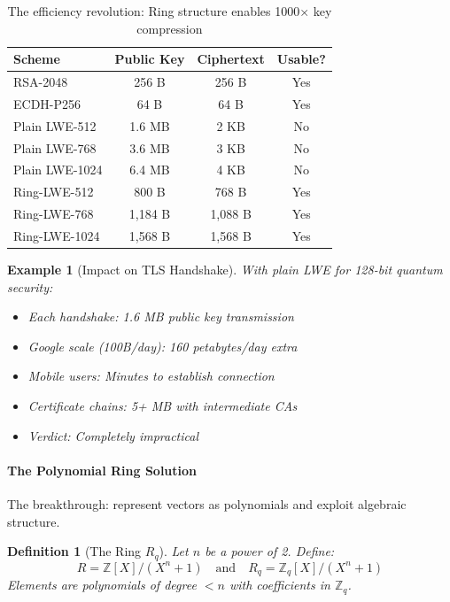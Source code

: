 \documentclass[11pt,a4paper]{article}
\newtheorem{definition}{Definition}
\newtheorem{example}{Example}
\begin{document}
\begin{table}[h]
\centering
\begin{tabular}{|l|c|c|c|}
\hline
\textbf{Scheme} & \textbf{Public Key} & \textbf{Ciphertext} & \textbf{Usable?} \\
\hline
RSA-2048 & 256 B & 256 B & Yes \\
ECDH-P256 & 64 B & 64 B & Yes \\
\hline
Plain LWE-512 & 1.6 MB & 2 KB & No \\
Plain LWE-768 & 3.6 MB & 3 KB & No \\
Plain LWE-1024 & 6.4 MB & 4 KB & No \\
\hline
Ring-LWE-512 & 800 B & 768 B & Yes \\
Ring-LWE-768 & 1,184 B & 1,088 B & Yes \\
Ring-LWE-1024 & 1,568 B & 1,568 B & Yes \\
\hline
\end{tabular}
\caption{The efficiency revolution: Ring structure enables 1000× key compression}
\end{table}

\begin{example}[Impact on TLS Handshake]
With plain LWE for 128-bit quantum security:
\begin{itemize}
    \item Each handshake: 1.6 MB public key transmission
    \item Google scale (100B/day): 160 petabytes/day extra
    \item Mobile users: Minutes to establish connection
    \item Certificate chains: 5+ MB with intermediate CAs
    \item Verdict: Completely impractical
\end{itemize}
\end{example}

\paragraph{The Polynomial Ring Solution}

The breakthrough: represent vectors as polynomials and exploit algebraic structure.

\begin{definition}[The Ring $R_q$]
Let $n$ be a power of 2. Define:
$$R = \mathbb{Z}[X]/(X^n + 1) \quad \text{and} \quad R_q = \mathbb{Z}_q[X]/(X^n + 1)$$
Elements are polynomials of degree $< n$ with coefficients in $\mathbb{Z}_q$.
\end{definition}
\end{document}
